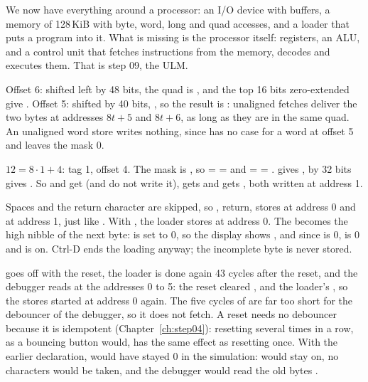 We now have everything around a processor: an I/O device with buffers, a
memory of 128\,KiB with byte, word, long and quad accesses, and a loader that
puts a program into it. What is missing is the processor itself: registers, an
ALU, and a control unit that fetches instructions from the memory, decodes
and executes them. That is step 09, the ULM.

\solutions

\solution
Offset 6: shifted left by 48 bits, the quad is , and
the top 16 bits zero-extended give . Offset 5: shifted
by 40 bits, , so the result is : unaligned
fetches deliver the two bytes at addresses $8t+5$ and $8t+6$, as long as they
are in the same quad. An unaligned word store writes nothing, since
 has no case for a word at offset 5 and leaves the mask 0.

\solution
$12 = 8 \cdot 1 + 4$: tag 1, offset 4. The mask is , so
 =  =  and  =  =
.  gives , 
by 32 bits gives . So  and  get
 (and do not write it),  gets  and
 gets , both written at address 1.

\solution
Spaces and the return character are skipped, so , return, 
stores  at address 0 and  at address 1, just like
. With , the loader stores  at address 0. The
 becomes the high nibble of the next byte:  is set to 0,
so the display shows , and since  is 0, 
is 0 and  is on. Ctrl-D ends the loading anyway; the incomplete byte
is never stored.

\solution
{} goes off with the reset, the loader is done again 43 cycles after
the reset, and the debugger reads  at the
addresses 0 to 5: the reset cleared ,  and the
loader's , so the stores started at address 0 again. The five
cycles of  are far too short for the debouncer of the debugger, so
it does not fetch. A reset needs no debouncer because it is idempotent
(Chapter~\ref{ch:step04}): resetting several times in a row, as a bouncing
button would, has the same effect as resetting once. With the earlier
declaration,  would have stayed 0 in the simulation:  would
stay on, no characters would be taken, and the debugger would read the old
bytes .
